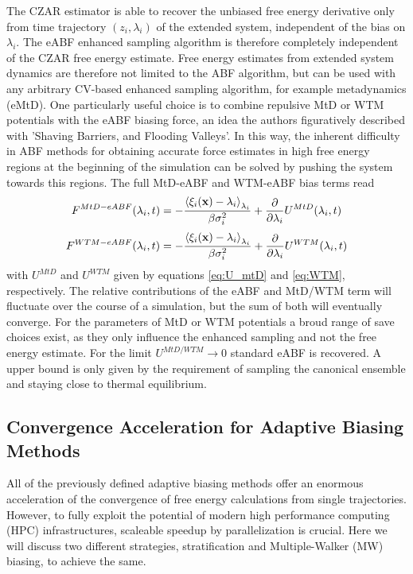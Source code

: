 The CZAR estimator is able to recover the unbiased free energy derivative only from time trajectory $(z_i,\lambda_i)$ of the extended system, independent of the bias on $\lambda_i$.
The eABF enhanced sampling algorithm is therefore completely independent of the CZAR free energy estimate.
Free energy estimates from extended system dynamics are therefore not limited to the ABF algorithm, but can be used with any arbitrary CV-based enhanced sampling algorithm, for example metadynamics (eMtD).
One particularly useful choice is to combine repulsive MtD or WTM potentials with the eABF biasing force, an idea the authors figuratively described with 'Shaving Barriers, and Flooding Valleys'.\autocite{fu2018zooming}
In this way, the inherent difficulty in ABF methods for obtaining accurate force estimates in high free energy regions at the beginning of the simulation can be solved by pushing the system towards this regions.
The full MtD-eABF and WTM-eABF bias terms read
\begin{equation}
  F^{MtD-eABF}(\lambda_i, t) = -\frac{\braket{\xi_i(\textbf{x})-\lambda_i}_{\lambda_i}}{\beta \sigma_i^2}+\frac{\partial}{\partial \lambda_i} U^{MtD}(\lambda_i,t)
\end{equation}
\begin{equation}
  F^{WTM-eABF}(\lambda_i, t) = -\frac{\braket{\xi_i(\textbf{x})-\lambda_i}_{\lambda_i}}{\beta \sigma_i^2}+\frac{\partial}{\partial \lambda_i} U^{WTM}(\lambda_i,t)
\end{equation}
with $U^{MtD}$ and $U^{WTM}$ given by equations \ref{eq:U_mtD} and \ref{eq:WTM}, respectively.
The relative contributions of the eABF and MtD/WTM term will fluctuate over the course of a simulation, but the sum of both will eventually converge.
For the parameters of MtD or WTM potentials a broud range of save choices exist, as they only influence the enhanced sampling and not the free energy estimate.
For the limit $U^{MtD/WTM}\rightarrow 0$ standard eABF is recovered. A upper bound is only given by the requirement of sampling the canonical ensemble and staying close to thermal equilibrium.

\newpage
\subsection{Convergence Acceleration for Adaptive Biasing Methods}
\label{sec:MW}
All of the previously defined adaptive biasing methods offer an enormous acceleration of the convergence of free energy calculations from single trajectories.
However, to fully exploit the potential of modern high performance computing (HPC) infrastructures, scaleable speedup by parallelization is crucial.
Here we will discuss two different strategies, stratification and Multiple-Walker (MW) biasing, to achieve the same.

